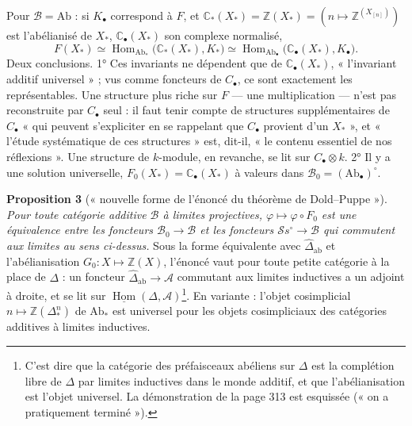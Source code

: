 \documentclass[11pt,a4paper]{article}
\begin{document}
Pour $\mathcal{B} = \mathrm{Ab}$ : si $K_\bullet$ correspond à $F$, et
$\mathbb{C}_*(X_*) = \mathbb{Z}(X_*) = (n \mapsto \mathbb{Z}^{(X_{[n]})})$ est
l'abélianisé de $X_*$, $\mathbb{C}_\bullet(X_*)$ son complexe normalisé,
\[
F(X_*) \simeq \operatorname{Hom}_{\mathrm{Ab}_*}\bigl(\mathbb{C}_*(X_*), K_*\bigr) \simeq \operatorname{Hom}_{\mathrm{Ab}_\bullet}\bigl(\mathbb{C}_\bullet(X_*), K_\bullet\bigr) .
\]
Deux conclusions. 1° Ces invariants ne dépendent que de $\mathbb{C}_\bullet(X_*)$,
« l'invariant additif universel » ; vus comme foncteurs de $C_\bullet$, ce sont
exactement les représentables. Une structure plus riche sur $F$ — une
multiplication — n'est pas reconstruite par $C_\bullet$ seul : il faut tenir
compte de structures supplémentaires de $C_\bullet$ « qui peuvent s'expliciter en
se rappelant que $C_\bullet$ provient d'un $X_*$ », et « l'étude systématique de
ces structures » est, dit-il, « le contenu essentiel de nos réflexions ». Une
structure de $k$-module, en revanche, se lit sur $C_\bullet \otimes k$. 2° Il y a
une solution universelle, $F_0(X_*) = \mathbb{C}_\bullet(X_*)$ à valeurs dans
$\mathcal{B}_0 = (\mathrm{Ab}_\bullet)^\circ$.

\textbf{Proposition 3} (« nouvelle forme de l'énoncé du théorème de
Dold–Puppe »). \emph{Pour toute catégorie additive $\mathcal{B}$ à limites
projectives, $\varphi \mapsto \varphi \circ F_0$ est une équivalence entre les
foncteurs $\mathcal{B}_0 \to \mathcal{B}$ et les foncteurs $\mathcal{S}s^\circ
\to \mathcal{B}$ qui commutent aux limites au sens ci-dessus.} Sous la forme
équivalente avec $\widehat{\Delta}_{\mathrm{ab}}$ et l'abélianisation
$G_0 : X \mapsto \mathbb{Z}(X)$, l'énoncé vaut pour toute petite catégorie à la
place de $\Delta$ : un foncteur $\widehat{\Delta}_{\mathrm{ab}} \to \mathcal{A}$
commutant aux limites inductives a un adjoint à droite, et se lit sur
$\underline{\operatorname{Hom}}(\Delta, \mathcal{A})$\footnote{C'est dire que la
catégorie des préfaisceaux abéliens sur $\Delta$ est la complétion libre de
$\Delta$ par limites inductives dans le monde additif, et que l'abélianisation
est l'objet universel. La démonstration de la page 313 est esquissée (« on a
pratiquement terminé »).}. En variante : l'objet cosimplicial $n \mapsto
\mathbb{Z}(\Delta^n_*)$ de $\mathrm{Ab}_*$ est universel pour les objets
cosimpliciaux des catégories additives à limites inductives.
\end{document}
